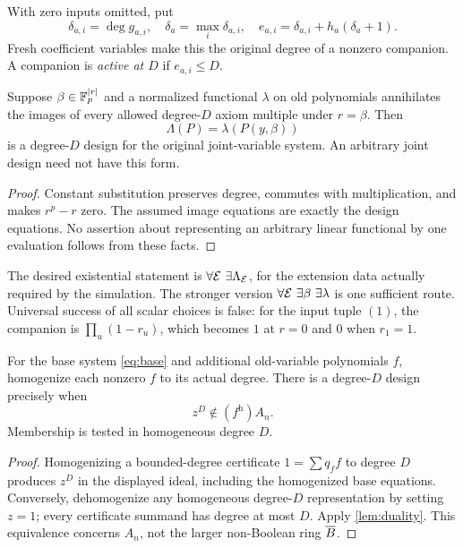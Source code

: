 With zero inputs omitted, put
\[
 \delta_{a,i}=\deg g_{a,i},\quad \delta_a=\max_i\delta_{a,i},\quad
 e_{a,i}=\delta_{a,i}+h_a(\delta_a+1).
\]
Fresh coefficient variables make this the original degree of a nonzero companion. A companion is \emph{active at $D$} if $e_{a,i}\le D$.

\begin{lemma}\label{lem:scalar-sufficient}
Suppose $\beta\in\mathbb F_p^{|r|}$ and a normalized functional $\lambda$ on old polynomials annihilates the images of every allowed degree-$D$ axiom multiple under $r=\beta$. Then
\[
 \Lambda(P)=\lambda(P(y,\beta))
\]
is a degree-$D$ design for the original joint-variable system. An arbitrary joint design need not have this form.
\end{lemma}
\begin{proof}
Constant substitution preserves degree, commutes with multiplication, and makes $r^p-r$ zero. The assumed image equations are exactly the design equations. No assertion about representing an arbitrary linear functional by one evaluation follows from these facts.
\end{proof}

The desired existential statement is $\forall\mathcal E\ \exists\Lambda_{\mathcal E}$, for the extension data actually required by the simulation. The stronger version $\forall\calE\ \exists\beta\ \exists\lambda$ is one sufficient route. Universal success of all scalar choices is false: for the input tuple $(1)$, the companion is $\prod_u(1-r_u)$, which becomes $1$ at $r=0$ and $0$ when $r_1=1$.

\begin{lemma}\label{lem:homogenization}
For the base system \eqref{eq:base} and additional old-variable polynomials $f$, homogenize each nonzero $f$ to its actual degree. There is a degree-$D$ design precisely when
\[
 z^D\notin(f^{\mathrm h})A_n.
\]
Membership is tested in homogeneous degree $D$.
\end{lemma}
\begin{proof}
Homogenizing a bounded-degree certificate $1=\sum q_ff$ to degree $D$ produces $z^D$ in the displayed ideal, including the homogenized base equations. Conversely, dehomogenize any homogeneous degree-$D$ representation by setting $z=1$; every certificate summand has degree at most $D$. Apply \cref{lem:duality}. This equivalence concerns $A_n$, not the larger non-Boolean ring $\overline B$.
\end{proof}
